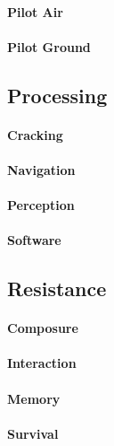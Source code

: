 \paragraph{Pilot Air}

\paragraph{Pilot Ground}

\subsection{Processing}

\paragraph{Cracking}

\paragraph{Navigation}

\paragraph{Perception}

\paragraph{Software}


\subsection{Resistance}

\paragraph{Composure}

\paragraph{Interaction}

\paragraph{Memory}

\paragraph{Survival}



